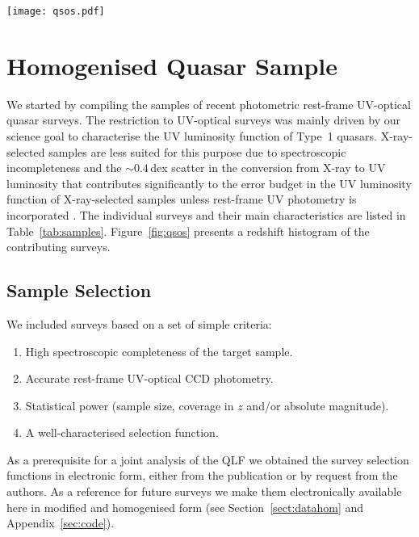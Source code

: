 \documentclass[fleqn,usenatbib]{mnras}
\begin{document}
\begin{figure*}
  \begin{center}
    \texttt{[image: qsos.pdf]}
  \end{center}
  \caption{Redshift distribution of the 83,488 AGN considered in this
    analysis.  Shown here are the observed AGN numbers, without
    correcting for incompleteness.  Further details on each of these
    data sets are in Table~\ref{tab:samples} and
    Section~\ref{sec:sample}.}
  \label{fig:qsos}
\end{figure*}

\section{Homogenised Quasar Sample}
\label{sec:sample}

We started by compiling the samples of recent photometric rest-frame
UV-optical quasar surveys. The restriction to UV-optical surveys was
mainly driven by our science goal to characterise the UV luminosity
function of Type~1 quasars. X-ray-selected samples are less suited for
this purpose due to spectroscopic incompleteness and the $\sim
0.4$\,dex scatter in the conversion from X-ray to UV luminosity
\citep{2010A&A...512A..34L, 2015MNRAS.453.1946G, 2016ApJ...819..154L}
that contributes significantly to the error budget in the UV
luminosity function of X-ray-selected samples unless rest-frame UV
photometry is incorporated \citep{2015AA...578A..83G}.  The individual
surveys and their main characteristics are listed in
Table~\ref{tab:samples}.  Figure~\ref{fig:qsos} presents a redshift
histogram of the contributing surveys.

\subsection{Sample Selection}
\label{sect:samplesel}

We included surveys based on a set of simple criteria:
\begin{enumerate}
\item High spectroscopic completeness of the target sample.
\item Accurate rest-frame UV-optical CCD photometry.
\item Statistical power (sample size, coverage in $z$ and/or absolute magnitude).
\item A well-characterised selection function.
\end{enumerate}
As a prerequisite for a joint analysis of the QLF we obtained the
survey selection functions in electronic form, either from the
publication or by request from the authors. As a reference for future
surveys we make them electronically available here in modified and
homogenised form (see Section~\ref{sect:datahom} and
Appendix~\ref{sec:code}).
\end{document}
